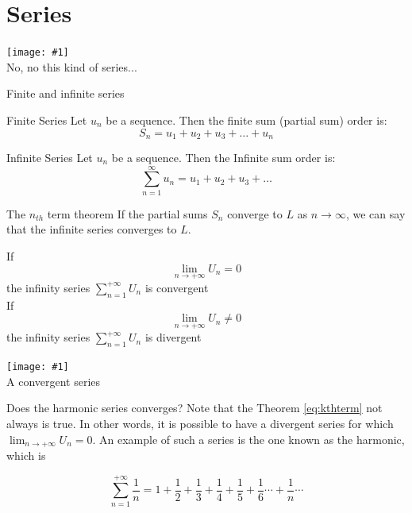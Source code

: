 \documentclass[newPxFont]{beamer}
\newcommand \imageFrame[2]{
\begingroup
\begin{frame}
  \begin{center}
\texttt{[image: \#1]}\\
\Large #2
    \end{center}
\end{frame}
\endgroup
}
\begin{document}
\section{Series}
\imageFrame{netflix}{No, no this kind of series...}
\begin{frame}{Finite and infinite series}
  \begin{block}{Finite Series}
    Let ${u_n}$ be a sequence. Then the finite sum (partial sum) order is:\\
    \begin{equation}
        S_n=u_1+u_2+u_3+\hdots+u_n
    \end{equation}
  \end{block}
  \pause
  \begin{block}{Infinite Series}
    Let ${u_n}$ be a sequence. Then the Infinite sum order is:\\
    \begin{equation}
        \sum_{n=1}^\infty u_n=u_1+u_2+u_3+\hdots
    \end{equation}
  \end{block}
\end{frame}
\begin{frame}{The $n_{th}$ term theorem}
If the partial sums $S_n$ converge to $L$ as $n\longrightarrow \infty$, we can say that the infinite series converges to $L$\cite{Math242017}.

\begin{theorem}
If
\begin{equation}
  \lim_{n \to +\infty} U_n=0\label{eq:kthterm}
\end{equation}
the infinity series $\sum_{n=1}^{+\infty} U_n$ is \alert{convergent}
\vspace{0.2in}\\
If
\begin{equation}
  \lim_{n \to +\infty} U_n\neq0
\end{equation}
the infinity series $\sum_{n=1}^{+\infty} U_n$ is \alert{divergent}
\end{theorem}
\end{frame}
\imageFrame{L}{A convergent series}
\begin{frame}{Does the harmonic series converges?}
Note that the Theorem \eqref{eq:kthterm} not always is true. In other words, it is possible to have a \alert{divergent} series for which $\lim_{n \to +\infty} U_n=0$. An example of such a series is the one known as the harmonic, which is

\pause
\begin{equation}
  \sum_{n=1}^{+\infty} \frac{1}{n}=1+\frac{1}{2}+\frac{1}{3}+\frac{1}{4}+\frac{1}{5}+\frac{1}{6}\cdots+\frac{1}{n}\cdots
\end{equation}
\end{frame}
\end{document}

